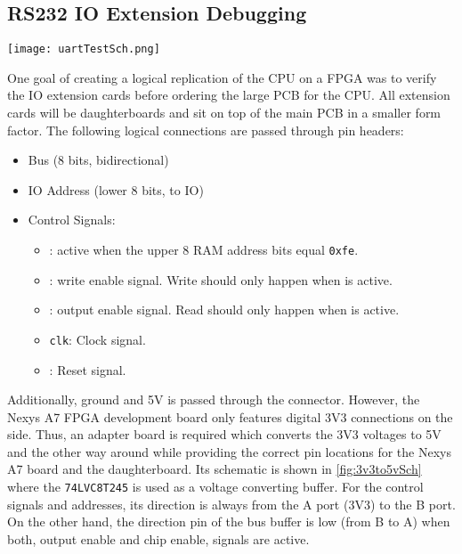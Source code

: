 \subsection{RS232 \gls{IO} Extension Debugging}
\begin{sidewaysfigure}[p]
  \centering
  \texttt{[image: uartTestSch.png]}
  \caption{The Schematic for the 3V3 to 5V conversion to use extension cards with the \gls{FPGA} development board.}
  \label{fig:3v3to5vSch}
\end{sidewaysfigure}
One goal of creating a logical replication of the \gls{CPU} on a \gls{FPGA} was to verify the \gls{IO} extension cards before ordering the large \gls{PCB} for the \gls{CPU}.
All extension cards will be daughterboards and sit on top of the main \gls{PCB} in a smaller form factor.
The following logical connections are passed through pin headers:
\begin{itemize}
  \item Bus (8 bits, bidirectional)
  \item \gls{IO} Address (lower 8 bits, to \gls{IO})
  \item Control Signals:
  \begin{itemize}
    \item \texttt{}: active when the upper 8 \gls{RAM} address bits equal \texttt{0xfe}.
    \item \texttt{}: write enable signal. Write should only happen when \texttt{} is active.
    \item \texttt{}: output enable signal. Read should only happen when \texttt{} is active.
    \item \texttt{clk}: Clock signal.
    \item \texttt{}: Reset signal.
  \end{itemize}
\end{itemize}
Additionally, ground and 5V is passed through the connector.
However, the Nexys A7 \gls{FPGA} development board only features digital 3V3 connections on the side.
Thus, an adapter board is required which converts the 3V3 voltages to 5V and the other way around while providing the correct pin locations for the Nexys A7 board and the daughterboard.
Its schematic is shown in \cref{fig:3v3to5vSch} where the \texttt{74LVC8T245} is used as a voltage converting buffer.
For the control signals and addresses, its direction is always from the A port (3V3) to the B port.
On the other hand, the direction pin of the bus buffer is low (from B to A) when both, output enable and chip enable, signals are active.